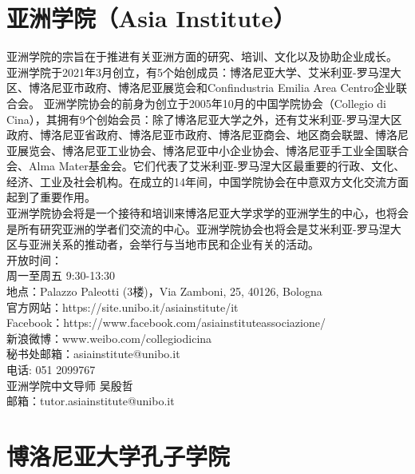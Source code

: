 \section{亚洲学院（Asia Institute）}

亚洲学院的宗旨在于推进有关亚洲方面的研究、培训、文化以及协助企业成长。
亚洲学院于2021年3月创立，有5个始创成员：博洛尼亚大学、艾米利亚-罗马涅大区、博洛尼亚市政府、博洛尼亚展览会和Confindustria Emilia Area Centro企业联合会。
亚洲学院协会的前身为创立于2005年10月的中国学院协会（Collegio di Cina），其拥有9个创始会员：除了博洛尼亚大学之外，还有艾米利亚-罗马涅大区政府、博洛尼亚省政府、博洛尼亚市政府、博洛尼亚商会、地区商会联盟、博洛尼亚展览会、博洛尼亚工业协会、博洛尼亚中小企业协会、博洛尼亚手工业全国联合会、Alma Mater基金会。它们代表了艾米利亚-罗马涅大区最重要的行政、文化、经济、工业及社会机构。在成立的14年间，中国学院协会在中意双方文化交流方面起到了重要作用。\\
亚洲学院协会将是一个接待和培训来博洛尼亚大学求学的亚洲学生的中心，也将会是所有研究亚洲的学者们交流的中心。亚洲学院协会也将会是艾米利亚-罗马涅大区与亚洲关系的推动者，会举行与当地市民和企业有关的活动。
\\
\noindent 
开放时间：\\
周一至周五  9:30-13:30\\
地点：Palazzo Paleotti (3楼)，Via Zamboni, 25, 40126, Bologna\\
官方网站：https://site.unibo.it/asiainstitute/it\\
Facebook：https://www.facebook.com/asiainstituteassociazione/\\
新浪微博：www.weibo.com/collegiodicina\\
秘书处邮箱：asiainstitute@unibo.it\\
电话: 051 2099767 \\
亚洲学院中文导师  吴殷哲\\
邮箱：tutor.asiainstitute@unibo.it\\
\section{博洛尼亚大学孔子学院}

